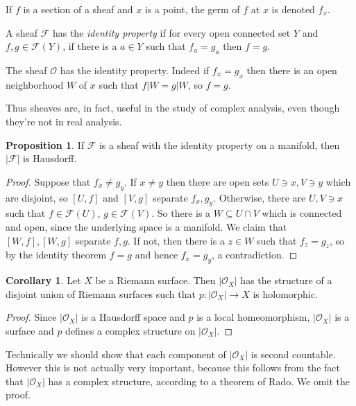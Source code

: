 \documentclass[12pt]{book}
\newcommand{\Olo}{\mathscr O}
\newcommand{\dfn}[1]{\emph{#1}\index{#1}}
\theoremstyle{definition}
\newtheorem{proposition}[theorem]{Proposition}
\newtheorem{corollary}[theorem]{Corollary}
\newenvironment{definition}
  {\pushQED{\qed}\renewcommand{\qedsymbol}{$\diamondsuit$}\definitionx}
  {\popQED\endexamplex}
\newenvironment{example}
  {\pushQED{\qed}\renewcommand{\qedsymbol}{$\diamondsuit$}\examplex}
  {\popQED\endexamplex}
\begin{document}
If $f$ is a section of a sheaf and $x$ is a point, the germ of $f$ at $x$ is denoted $f_x$.

\begin{definition}
A sheaf $\mathscr F$ has the \dfn{identity property} if for every open connected set $Y$ and $f,g \in \mathscr F(Y)$, if there is a $a \in Y$ such that $f_a = g_a$ then $f = g$.
\end{definition}

\begin{example}
The sheaf $\Olo$ has the identity property. Indeed if $f_x = g_x$ then there is an open neighborhood $W$ of $x$ such that $f|W = g|W$, so $f = g$.
\end{example}

Thus sheaves are, in fact, useful in the study of complex analysis, even though they're not in real analysis.

\begin{proposition}
If $\mathscr F$ is a sheaf with the identity property on a manifold, then $|\mathscr F|$ is Hausdorff.
\end{proposition}
\begin{proof}
Suppose that $f_x \neq g_y$.
If $x \neq y$ then there are open sets $U \ni x, V \ni y$ which are disjoint, so $[U, f]$ and $[V, g]$ separate $f_x,g_y$.
Otherwise, there are $U, V \ni x$ such that $f \in \mathscr F(U)$, $g \in \mathscr F(V)$.
So there is a $W \subseteq U \cap V$ which is connected and open, since the underlying space is a manifold.
We claim that $[W,f],[W,g]$ separate $f,g$.
If not, then there is a $z \in W$ such that $f_z = g_z$, so by the identity theorem $f = g$ and hence $f_x = g_y$, a contradiction.
\end{proof}

\begin{corollary}
Let $X$ be a Riemann surface. Then $|\Olo_X|$ has the structure of a disjoint union of Riemann surfaces such that $p: |\Olo_X| \to X$ is holomorphic.
\end{corollary}
\begin{proof}
Since $|\Olo_X|$ is a Hausdorff space and $p$ is a local homeomorphism, $|\Olo_X|$ is a surface and $p$ defines a complex structure on $|\Olo_X|$.
\end{proof}

Technically we should show that each component of $|\Olo_X|$ is second countable.
However this is not actually very important, because this follows from the fact that $|\Olo_X|$ has a complex structure, according to a theorem of Rado.
We omit the proof.
\end{document}
